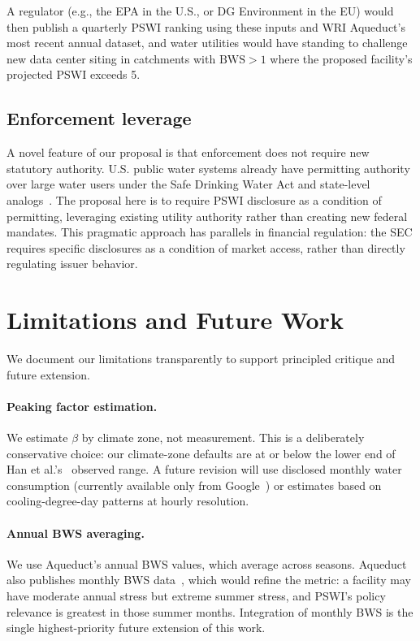\documentclass[conference,10pt]{IEEEtran}
\begin{document}
A regulator (e.g., the EPA in the U.S., or DG Environment in the EU)
would then publish a quarterly PSWI ranking using these inputs and
WRI Aqueduct's most recent annual dataset, and water utilities would
have standing to challenge new data center siting in catchments with
$\textrm{BWS} > 1$ where the proposed facility's projected PSWI
exceeds 5.

\subsection{Enforcement leverage}

A novel feature of our proposal is that enforcement does not require
new statutory authority. U.S. public water systems already have
permitting authority over large water users under the Safe Drinking
Water Act and state-level analogs~\cite{epa2024watercongress}. The
proposal here is to require PSWI disclosure as a condition of
permitting, leveraging existing utility authority rather than creating
new federal mandates. This pragmatic approach has parallels in
financial regulation: the SEC requires specific disclosures as a
condition of market access, rather than directly regulating issuer
behavior.

\section{Limitations and Future Work}
\label{sec:limitations}

We document our limitations transparently to support principled
critique and future extension.

\paragraph{Peaking factor estimation.}
We estimate $\beta$ by climate zone, not measurement. This is a
deliberately conservative choice: our climate-zone defaults are at or
below the lower end of Han et al.'s~\cite{han2026} observed range. A
future revision will use disclosed monthly water consumption (currently
available only from Google~\cite{google2025envreport}) or estimates
based on cooling-degree-day patterns at hourly resolution.

\paragraph{Annual BWS averaging.}
We use Aqueduct's annual BWS values, which average across seasons.
Aqueduct also publishes monthly BWS data~\cite{kuzma2023aqueduct},
which would refine the metric: a facility may have moderate annual
stress but extreme summer stress, and PSWI's policy relevance is
greatest in those summer months. Integration of monthly BWS is the
single highest-priority future extension of this work.
\end{document}
